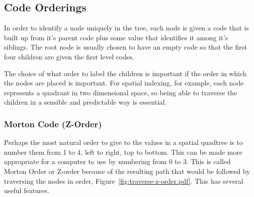\subsection{Code Orderings}
\label{sub:code_orderings}

In order to identify a node uniquely in the tree, each node is given a code
that is built up from it's parent code plus some value that identifies it
among it's siblings. The root node is usually chosen to have an empty code so
that the first four children are given the first level codes.

The choice of what order to label the children is important if the order
in which the nodes are placed is important. For spatial indexing, for example,
each node represents a quadrant in two dimensional space, so being able to
traverse the children in a sensible and predictable way is essential.

\subsubsection[Morton Code]{Morton Code (Z-Order)}
\label{ssub:morton_code_z_order_}

Perhaps the most natural order to give to the values in a spatial quadtree is
to number them from 1 to 4, left to right, top to bottom. This can be made
more appropriate for a computer to use by numbering from 0 to 3. This is
called Morton Order\cite{mortoncomputer} or Z-order because of the resulting
path that would be followed by traversing the nodes in order,
Figure~\ref{fig:traverse-z-order.pdf}. This has several useful features.

